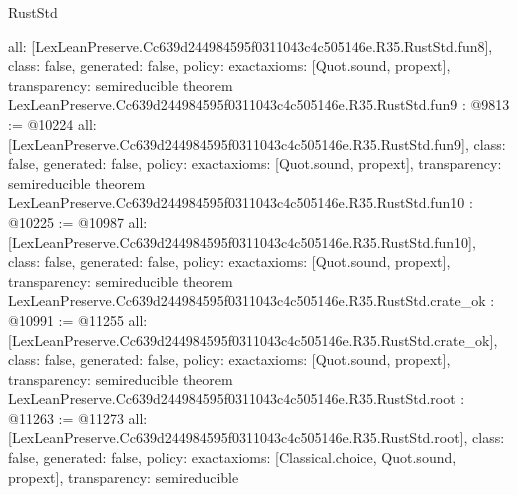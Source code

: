 \begin{lexlean}{RustStd}
\begin{coremodule}
{  all: [LexLeanPreserve.Cc639d244984595f0311043c4c505146e.R35.RustStd.fun8],
  class: false,
  generated: false,
  policy: exact{axioms: [Quot.sound, propext]},
  transparency: semireducible
}
theorem LexLeanPreserve.Cc639d244984595f0311043c4c505146e.R35.RustStd.fun9 : @9813 := @10224 {
  all: [LexLeanPreserve.Cc639d244984595f0311043c4c505146e.R35.RustStd.fun9],
  class: false,
  generated: false,
  policy: exact{axioms: [Quot.sound, propext]},
  transparency: semireducible
}
theorem LexLeanPreserve.Cc639d244984595f0311043c4c505146e.R35.RustStd.fun10 : @10225 := @10987 {
  all: [LexLeanPreserve.Cc639d244984595f0311043c4c505146e.R35.RustStd.fun10],
  class: false,
  generated: false,
  policy: exact{axioms: [Quot.sound, propext]},
  transparency: semireducible
}
theorem LexLeanPreserve.Cc639d244984595f0311043c4c505146e.R35.RustStd.crate_ok : @10991 := @11255 {
  all: [LexLeanPreserve.Cc639d244984595f0311043c4c505146e.R35.RustStd.crate_ok],
  class: false,
  generated: false,
  policy: exact{axioms: [Quot.sound, propext]},
  transparency: semireducible
}
theorem LexLeanPreserve.Cc639d244984595f0311043c4c505146e.R35.RustStd.root : @11263 := @11273 {
  all: [LexLeanPreserve.Cc639d244984595f0311043c4c505146e.R35.RustStd.root],
  class: false,
  generated: false,
  policy: exact{axioms: [Classical.choice, Quot.sound, propext]},
  transparency: semireducible
}


\end{coremodule}
\end{lexlean}

